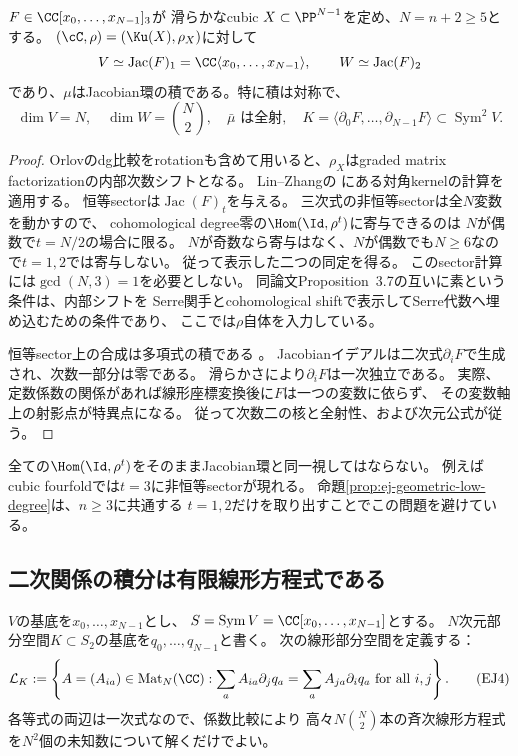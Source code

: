 \begin{proposition}[可換cubicにおける低次数の同定]
\label{prop:ej-geometric-low-degree}
$F\in\CC[x_0,\ldots,x_{N-1}]_3$が
滑らかなcubic $X\subset\PP^{N-1}$を定め、$N=n+2\ge5$とする。
$(\cC,\rho)=(\Ku(X),\rho_X)$に対して
\[
 V\simeq\operatorname{Jac}(F)_1=\CC\langle x_0,\ldots,x_{N-1}\rangle,
 \qquad W\simeq\operatorname{Jac}(F)_2
\]
であり、$\mu$はJacobian環の積である。特に積は対称で、
\[
 \dim V=N,\quad \dim W=\binom N2,\quad
 \bar\mu\text{ は全射},\quad
 K=\langle\partial_0F,\ldots,\partial_{N-1}F\rangle
 \subset\operatorname{Sym}^2V.
 \tag{EJ3}\label{eq:ej-jacobian-kernel}
\]
\end{proposition}
\begin{proof}
Orlovのdg比較をrotationも含めて用いると、$\rho_X$はgraded matrix
factorizationの内部次数シフトとなる。
Lin--Zhangの\cite[Theorem~2.2, Theorem~3.5, Remark~3.6, Section~5]{LZ}
にある対角kernelの計算を適用する。
恒等sectorは$\operatorname{Jac}(F)_t$を与える。
三次式の非恒等sectorは全$N$変数を動かすので、
cohomological degree零の$\Hom(\Id,\rho^t)$に寄与できるのは
$N$が偶数で$t=N/2$の場合に限る。
$N$が奇数なら寄与はなく、$N$が偶数でも$N\ge6$なので$t=1,2$では寄与しない。
従って表示した二つの同定を得る。
このsector計算には$\gcd(N,3)=1$を必要としない。
同論文Proposition~3.7の互いに素という条件は、内部シフトを
Serre関手とcohomological shiftで表示してSerre代数へ埋め込むための条件であり、
ここでは$\rho$自体を入力している。

恒等sector上の合成は多項式の積である
\cite[Remark~3.6]{LZ}。
Jacobianイデアルは二次式$\partial_iF$で生成され、次数一部分は零である。
滑らかさにより$\partial_iF$は一次独立である。
実際、定数係数の関係があれば線形座標変換後に$F$は一つの変数に依らず、
その変数軸上の射影点が特異点になる。
従って次数二の核と全射性、および次元公式が従う。
\end{proof}

\begin{remark}[低次数だけを使う理由]
全ての$\Hom(\Id,\rho^t)$をそのままJacobian環と同一視してはならない。
例えばcubic fourfoldでは$t=3$に非恒等sectorが現れる。
命題\ref{prop:ej-geometric-low-degree}は、$n\ge3$に共通する
$t=1,2$だけを取り出すことでこの問題を避けている。
\end{remark}

\subsection{二次関係の積分は有限線形方程式である}

$V$の基底を$x_0,\ldots,x_{N-1}$とし、
$S=\operatorname{Sym}V=\CC[x_0,\ldots,x_{N-1}]$とする。
$N$次元部分空間$K\subset S_2$の基底を$q_0,\ldots,q_{N-1}$と書く。
次の線形部分空間を定義する：
\[
 \mathcal L_K:=\left\{A=(A_{ia})\in\operatorname{Mat}_N(\CC):
 \sum_a A_{ia}\partial_jq_a=\sum_a A_{ja}\partial_iq_a
 \text{ for all }i,j\right\}.
 \tag{EJ4}\label{eq:ej-integrability}
\]
各等式の両辺は一次式なので、係数比較により
高々$N\binom N2$本の斉次線形方程式を$N^2$個の未知数について解くだけでよい。

